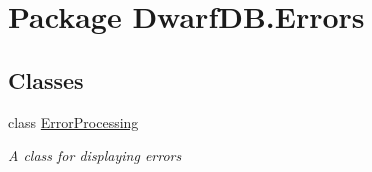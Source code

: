 \hypertarget{namespace_dwarf_d_b_1_1_errors}{\section{Package Dwarf\+D\+B.\+Errors}
\label{namespace_dwarf_d_b_1_1_errors}
}
\subsection*{Classes}
\begin{DoxyCompactItemize}
\item 
class \hyperlink{class_dwarf_d_b_1_1_errors_1_1_error_processing}{Error\+Processing}
\begin{DoxyCompactList}\small\item\em A class for displaying errors \end{DoxyCompactList}\end{DoxyCompactItemize}
